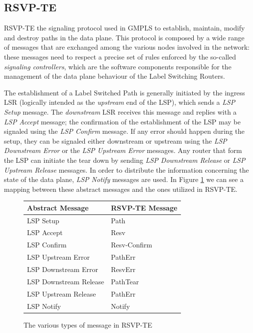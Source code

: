 \documentclass[10pt,a4paper]{report}
\begin{document}
\subsection{RSVP-TE}

RSVP-TE the signaling protocol used in GMPLS to establish, maintain,
modify and destroy paths in the data plane. This protocol is composed
by a wide range of messages that are exchanged among the various nodes
involved in the network: these messages need to respect a precise set
of rules enforced by the so-called \textit{signaling controllers},
which are the software components responsible for the management of
the data plane behaviour of the Label Switching Routers.

The establishment of a Label Switched Path is generally initiated by
the ingress LSR (logically intended as the \textit{upstream} end of
the LSP), which sends a \textit{LSP Setup} message. The
\textit{downstream} LSR receives this message and replies with a
\textit{LSP Accept} message; the confirmation of the establishment of
the LSP may be signaled using the \textit{LSP Confirm} message. If any
error should happen during the setup, they can be signaled either
downstream or upstream using the \textit{LSP Downstream Error} or the
\textit{LSP Upstream Error} messages. Any router that form the LSP can
initiate the tear down by sending \textit{LSP Downstream Release} or
\textit{LSP Upstream Release} messages. In order to distribute the
information concerning the state of the data plane, \textit{LSP
  Notify} messages are used. In Figure \ref{fig:rsvp_messages} we can
see a mapping between these abstract messages and the ones utilized in
RSVP-TE.

\begin{figure}[!htbp]
  \begin{center}
    \begin{tabular}{|l|l|}
      \hline
      Abstract Message &  RSVP-TE Message \\ \hline
      LSP Setup & Path \\
      LSP Accept & Resv \\
      LSP Confirm & Resv-Confirm \\
      LSP Upstream Error & PathErr \\
      LSP Downstream Error & ResvErr \\
      LSP Downstream Release & PathTear \\
      LSP Upstream Release & PathErr \\
      LSP Notify & Notify \\
      \hline
    \end{tabular}
    \caption[RSVP-TE Messages]{The various types of message in RSVP-TE}
    \label{fig:rsvp_messages}
  \end{center}
\end{figure}
\end{document}
